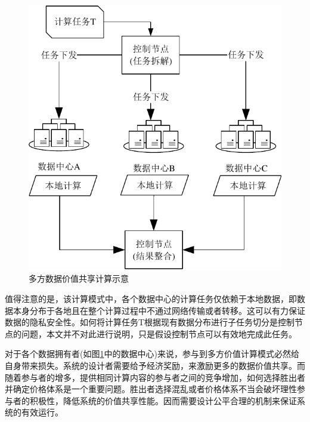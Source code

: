 \documentclass[promaster]{thesis-uestc}
\begin{document}
\begin{figure}[h]
\includegraphics{pic/yuanweishiyi.pdf}
\caption{多方数据价值共享计算示意}
\label{yuanweishiyi}
\end{figure}

值得注意的是，该计算模式中，各个数据中心的计算任务仅依赖于本地数据，即数据本身分布于各地且在整个计算过程中不通过网络传输或者转移。这可以有力保证数据的隐私安全性。如何将计算任务T根据现有数据分布进行子任务切分是控制节点的问题，本文并不对此进行说明，只是假设控制节点可以有效地完成此任务。

对于各个数据拥有者(如图\ref{yuanweishiyi}中的数据中心)来说，参与到多方价值计算模式必然给自身带来损失。系统的设计者需要给予经济奖励，来激励更多的数据价值共享。而随着参与者的增多，提供相同计算内容的参与者之间的竞争增加，如何选择胜出者并确定价格体系是一个重要问题。胜出者选择混乱或者价格体系不当会破坏理性参与者的积极性，降低系统的价值共享性能。因而需要设计公平合理的机制来保证系统的有效运行。
\end{document}
